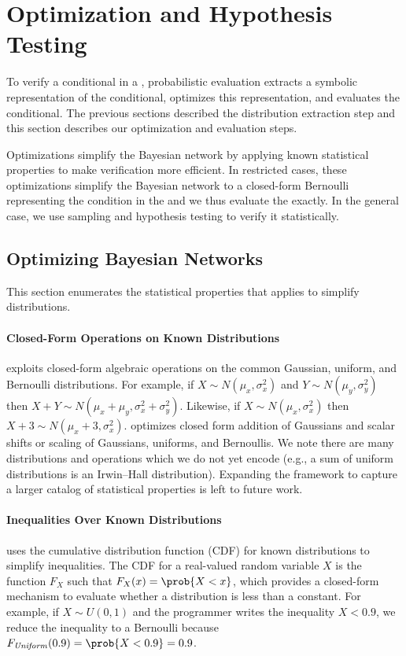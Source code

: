 \section{Optimization and Hypothesis Testing}
\label{passert:sec:mechanisms}

To verify a conditional in a \passert, probabilistic evaluation
extracts a symbolic representation of the conditional, optimizes this
representation, and evaluates the conditional.  The previous sections
described the distribution extraction step and this section describes our
optimization and evaluation steps. 

Optimizations simplify the Bayesian network by applying known
statistical properties to make verification more efficient. In
restricted cases, these optimizations simplify the Bayesian network to a
closed-form Bernoulli representing the condition in the \passert and we thus
evaluate the \passert exactly. In the general case, we use sampling
and hypothesis testing to verify it statistically.

\subsection{Optimizing Bayesian Networks}
\label{passert:sec:optim}

This section enumerates the statistical
properties that \tool applies to simplify distributions.

\paragraph{Closed-Form Operations on Known Distributions}
\tool exploits closed-form algebraic operations on the common
Gaussian, uniform, and Bernoulli distributions.
For example, if $X \sim N(\mu_x, \sigma^2_x)$ and $Y \sim N(\mu_y,
\sigma^2_y)$ then $X + Y \sim N(\mu_x + \mu_y, \sigma^2_x +
\sigma^2_y)$.  Likewise, if $X \sim N(\mu_x, \sigma^2_x)$ then $X + 3
\sim N(\mu_x + 3, \sigma^2_x)$.  \tool optimizes closed form addition
of Gaussians and scalar shifts or scaling of Gaussians, uniforms, and
Bernoullis.  We note there are many distributions and operations which
we do not yet encode (e.g., a sum of uniform distributions is
an Irwin--Hall distribution).
Expanding the framework to capture a larger catalog of statistical properties is left
to future work.

\paragraph{Inequalities Over Known Distributions} \tool uses the
cumulative distribution function (CDF) for known distributions to
simplify inequalities.  The CDF for a real-valued random variable $X$ is
the function $F_X$ such that $F_X(x) = \prob{X < x}$, which provides a
closed-form mechanism to evaluate whether a distribution is less than
a constant.  For example, if $X \sim U(0,1)$ and the programmer writes
the inequality $X < 0.9$, we reduce the inequality
to a Bernoulli because $F_{\mathit{Uniform}}(0.9) = \prob{X < 0.9} = 0.9$.  

